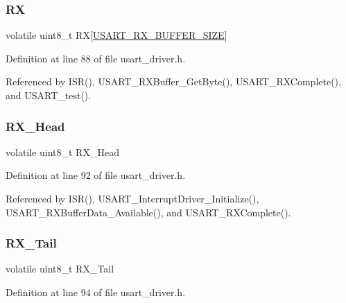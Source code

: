 \subsubsection{\texorpdfstring{RX}{RX}}
{\footnotesize\ttfamily volatile uint8\+\_\+t RX\mbox{[}\hyperlink{usart__driver_8h_ac0999c0821d14cfab43e6f3c778c2b95}{U\+S\+A\+R\+T\+\_\+\+R\+X\+\_\+\+B\+U\+F\+F\+E\+R\+\_\+\+S\+I\+ZE}\mbox{]}}



Definition at line 88 of file usart\+\_\+driver.\+h.



Referenced by I\+S\+R(), U\+S\+A\+R\+T\+\_\+\+R\+X\+Buffer\+\_\+\+Get\+Byte(), U\+S\+A\+R\+T\+\_\+\+R\+X\+Complete(), and U\+S\+A\+R\+T\+\_\+test().

\hypertarget{struct_u_s_a_r_t___buffer_aca7bb6ebcc2a3f266fac41649a250041}{}\label{struct_u_s_a_r_t___buffer_aca7bb6ebcc2a3f266fac41649a250041} 
\subsubsection{\texorpdfstring{R\+X\+\_\+\+Head}{RX\_Head}}
{\footnotesize\ttfamily volatile uint8\+\_\+t R\+X\+\_\+\+Head}



Definition at line 92 of file usart\+\_\+driver.\+h.



Referenced by I\+S\+R(), U\+S\+A\+R\+T\+\_\+\+Interrupt\+Driver\+\_\+\+Initialize(), U\+S\+A\+R\+T\+\_\+\+R\+X\+Buffer\+Data\+\_\+\+Available(), and U\+S\+A\+R\+T\+\_\+\+R\+X\+Complete().

\hypertarget{struct_u_s_a_r_t___buffer_acbe55e05936cb836303c2fd41ec2d734}{}\label{struct_u_s_a_r_t___buffer_acbe55e05936cb836303c2fd41ec2d734} 
\subsubsection{\texorpdfstring{R\+X\+\_\+\+Tail}{RX\_Tail}}
{\footnotesize\ttfamily volatile uint8\+\_\+t R\+X\+\_\+\+Tail}



Definition at line 94 of file usart\+\_\+driver.\+h.



